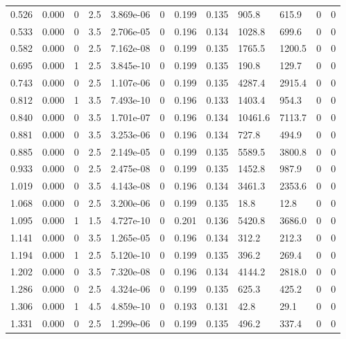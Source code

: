 \documentclass[preview]{standalone}
\begin{document}
{{\begin{tabular}{L{1.2cm}C{1.2cm} C{0.3cm}C{0.5cm} C{1.4cm}C{1.4cm} C{1.4cm}C{1.4cm} C{1.6cm}C{1.6cm} C{1.6cm}C{1.6cm}}
  0.526  &  0.000  & 0     & 2.5 &  3.869e-06  & 0  &  0.199&   0.135& 905.8 & 615.9   &  0 & 0  \\ 
  0.533  &  0.000  & 0     & 3.5 &  2.706e-05  & 0  &  0.196&   0.134& 1028.8 & 699.6   &  0 & 0  \\ 
  0.582  &  0.000  & 0     & 2.5 &  7.162e-08  & 0  &  0.199&   0.135& 1765.5 & 1200.5   &  0 & 0  \\ 
  0.695  &  0.000  & 1     & 2.5 &  3.845e-10  & 0  &  0.199&   0.135& 190.8 & 129.7   &  0 & 0  \\ 
  0.743  &  0.000  & 0     & 2.5 &  1.107e-06  & 0  &  0.199&   0.135& 4287.4 & 2915.4   &  0 & 0  \\ 
  0.812  &  0.000  & 1     & 3.5 &  7.493e-10  & 0  &  0.196&   0.133& 1403.4 & 954.3   &  0 & 0  \\ 
  0.840  &  0.000  & 0     & 3.5 &  1.701e-07  & 0  &  0.196&   0.134& 10461.6 & 7113.7   &  0 & 0  \\ 
  0.881  &  0.000  & 0     & 3.5 &  3.253e-06  & 0  &  0.196&   0.134& 727.8 & 494.9   &  0 & 0  \\ 
  0.885  &  0.000  & 0     & 2.5 &  2.149e-05  & 0  &  0.199&   0.135& 5589.5 & 3800.8   &  0 & 0  \\ 
  0.933  &  0.000  & 0     & 2.5 &  2.475e-08  & 0  &  0.199&   0.135& 1452.8 & 987.9   &  0 & 0  \\ 
  1.019  &  0.000  & 0     & 3.5 &  4.143e-08  & 0  &  0.196&   0.134& 3461.3 & 2353.6   &  0 & 0  \\ 
  1.068  &  0.000  & 0     & 2.5 &  3.200e-06  & 0  &  0.199&   0.135& 18.8 & 12.8   &  0 & 0  \\ 
  1.095  &  0.000  & 1     & 1.5 &  4.727e-10  & 0  &  0.201&   0.136& 5420.8 & 3686.0   &  0 & 0  \\ 
  1.141  &  0.000  & 0     & 3.5 &  1.265e-05  & 0  &  0.196&   0.134& 312.2 & 212.3   &  0 & 0  \\ 
  1.194  &  0.000  & 1     & 2.5 &  5.120e-10  & 0  &  0.199&   0.135& 396.2 & 269.4   &  0 & 0  \\ 
  1.202  &  0.000  & 0     & 3.5 &  7.320e-08  & 0  &  0.196&   0.134& 4144.2 & 2818.0   &  0 & 0  \\ 
  1.286  &  0.000  & 0     & 2.5 &  4.324e-06  & 0  &  0.199&   0.135& 625.3 & 425.2   &  0 & 0  \\ 
  1.306  &  0.000  & 1     & 4.5 &  4.859e-10  & 0  &  0.193&   0.131& 42.8 & 29.1   &  0 & 0  \\ 
  1.331  &  0.000  & 0     & 2.5 &  1.299e-06  & 0  &  0.199&   0.135& 496.2 & 337.4   &  0 & 0  \\ 

\end{tabular}}}
\end{document}
